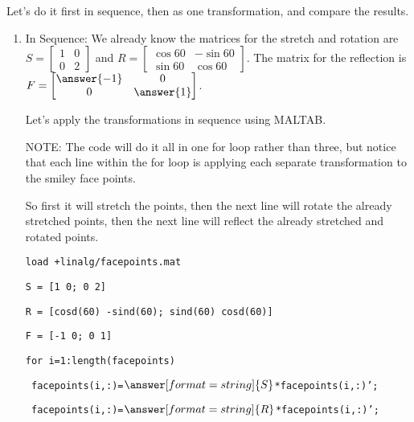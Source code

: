 \documentclass{ximera}
\begin{document}
\begin{exploration}
\begin{example}
        Let's do it first in sequence, then as one transformation, and compare the results.

        \begin{enumerate}

            \item In Sequence: We already know the matrices for the stretch and rotation are $S=\begin{bmatrix} 1 & 0 \\ 0 & 2 \end{bmatrix}$ and $R=\begin{bmatrix} \cos 60 & -\sin 60 \\ \sin 60 & \cos 60 \end{bmatrix}$. The matrix for the reflection is $F=\begin{bmatrix} \answer{-1} & 0 \\ 0 & \answer{1} \end{bmatrix}$.
            
            Let's apply the transformations in sequence using MALTAB. 
            
            \begin{hint}
            
            NOTE: The code will do it all in one for loop rather than three, but notice that each line within the for loop is applying each separate transformation to the smiley face points. 
            
            So first it will stretch the points, then the next line will rotate the already stretched points, then the next line will reflect the already stretched and rotated points.

            \end{hint}



            \texttt{load +linalg/face\textunderscore points.mat}

            \texttt{S = [1 0; 0 2]}

            \texttt{R = [cosd(60) -sind(60); sind(60) cosd(60)]}

            \texttt{F = [-1 0; 0 1]}

            \texttt{for i=1:length(face\textunderscore points)}

            \texttt{    face\textunderscore points(i,:)=}$\answer[format=string]{S}$\texttt{*face\textunderscore points(i,:)';}

            \texttt{        face\textunderscore points(i,:)=}$\answer[format=string]{R}$\texttt{*face\textunderscore points(i,:)';}


\end{enumerate}
\end{example}
\end{exploration}
\end{document}
